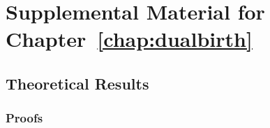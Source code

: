 \chapter{Supplemental Material for Chapter~\ref{chap:dualbirth}}
\label{chap:dualbirth-sup}
\clearpage

\section{Theoretical Results}\label{sup:theory}\label{sup:sec:app-theory}
\subsection{Proofs}\label{sup:probdist}\label{sup:sec:app-theory-P2}
\label{sup:sec:cherries}
\label{sup:exp-bl}


